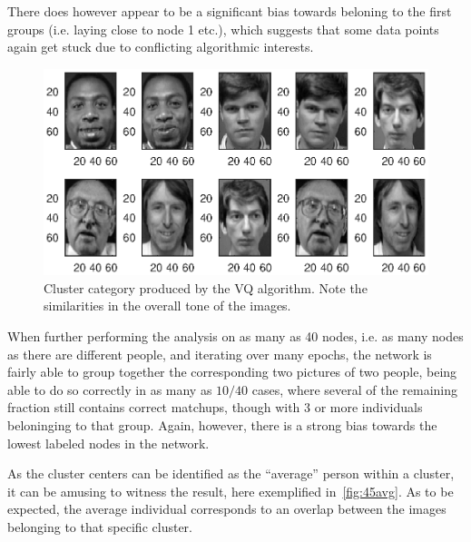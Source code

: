 \documentclass[a4paper,12pt]{article}
\theoremstyle{plain}
\theoremstyle{definition}
\begin{document}
      There does however appear to be a significant bias towards beloning to the
      first groups (i.e. laying close to node 1 etc.), which suggests that some
      data points again get stuck due to conflicting algorithmic interests.

      \begin{figure}[H]
         \centering
         \includegraphics[scale=.8,trim=0 4cm 0 0]{45}
         \caption{Cluster category produced by the VQ algorithm. Note the
         similarities in the overall tone of the images.}
         \label{fig:45}
      \end{figure}

      
      When further performing the analysis on as many as 40 nodes, i.e. as many
      nodes as there are different people, and iterating over many epochs, the
      network is fairly able to group together the corresponding two pictures of
      two people, being able to do so correctly in as many as $10/40$ cases,
      where several of the remaining fraction still contains correct matchups,
      though with 3 or more individuals beloninging to that group. Again,
      however, there is a strong bias towards the lowest labeled nodes in the network.
   
      As the cluster centers can be identified as the ``average'' person within
      a cluster, it can be amusing to witness the result, here exemplified in~\cref{fig:45avg}. 
      As to be expected, the average individual corresponds to an
      overlap between the images belonging to that specific cluster. 
      
\end{document}

